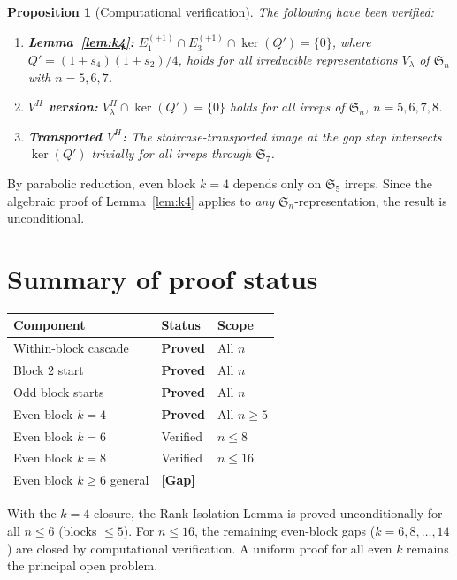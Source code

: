 \documentclass[11pt]{article}
\newtheorem{proposition}[theorem]{Proposition}
\theoremstyle{definition}
\theoremstyle{remark}
\newcommand{\Sym}{\mathfrak{S}}
\begin{document}
\begin{proposition}[Computational verification]\label{prop:comp}
The following have been verified:
\begin{enumerate}
  \item \textbf{Lemma~\ref{lem:k4}:}
    $E_1^{(+1)} \cap E_3^{(+1)} \cap \ker(Q') = \{0\}$,
    where $Q' = (1 + s_4)(1 + s_2)/4$, holds for all irreducible
    representations $V_\lambda$ of\/ $\Sym_n$ with $n = 5, 6, 7$.

  \item \textbf{$V^H$ version:}
    $V_\lambda^H \cap \ker(Q') = \{0\}$ holds for all irreps
    of\/ $\Sym_n$, $n = 5, 6, 7, 8$.

  \item \textbf{Transported $V^H$:} The staircase-transported image
    at the gap step intersects $\ker(Q')$ trivially for all irreps
    through $\Sym_7$.
\end{enumerate}
\end{proposition}

By parabolic reduction, even block $k = 4$ depends only on $\Sym_5$
irreps.  Since the algebraic proof of Lemma~\ref{lem:k4} applies to
\emph{any} $\Sym_n$-representation, the result is unconditional.


\section{Summary of proof status}

\begin{center}
\begin{tabular}{lll}
\toprule
\textbf{Component} & \textbf{Status} & \textbf{Scope} \\
\midrule
Within-block cascade & \textbf{Proved} & All $n$ \\
Block $2$ start & \textbf{Proved} & All $n$ \\
Odd block starts & \textbf{Proved} & All $n$ \\
Even block $k = 4$ & \textbf{Proved} & All $n \ge 5$ \\
\midrule
Even block $k = 6$ & Verified & $n \le 8$ \\
Even block $k = 8$ & Verified & $n \le 16$ \\
Even block $k \ge 6$ general & \textbf{[Gap]} & \\
\bottomrule
\end{tabular}
\end{center}

\medskip
With the $k = 4$ closure, the Rank Isolation Lemma is proved
unconditionally for all $n \le 6$ (blocks $\le 5$).  For $n \le 16$,
the remaining even-block gaps ($k = 6, 8, \ldots, 14$) are closed by
computational verification.  A uniform proof for all even $k$ remains
the principal open problem.
\end{document}

